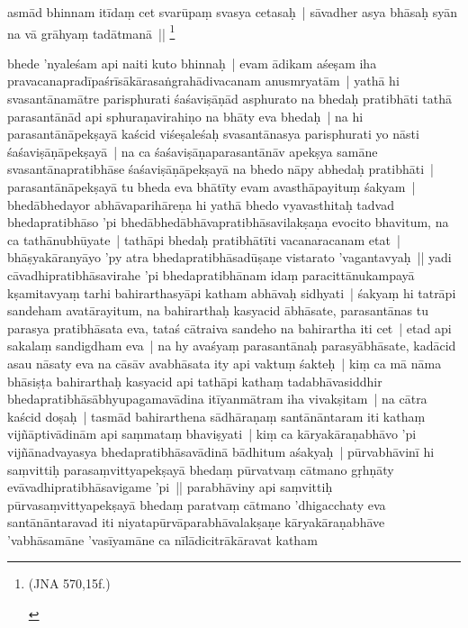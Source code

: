 \documentclass[article,a4paper]{memoir}
\begin{document}
	  \pstart asmā\-d bhinnam itī\-daṃ cet svarū\-paṃ svasya cetasaḥ | sā\-vadher asya bhā\-saḥ syā\-n na vā\- grā\-hyaṃ tadā\-tmanā\- || \footnote{\begin{english}(JNA 570,15f.)\end{english}}
	\pend
      

	  \pstart bhede 'nyaleśam api naiti kuto bhinnaḥ | evam ā\-dikam aśeṣam iha pravacanapradī\-paśrī\-sā\-kā\-rasaṅgrahā\-divacanam anusmryatā\-m | \label{thakur75-147.21} yathā\- hi svasantā\-namā\-tre parisphurati śaśaviṣā\-ṇā\-d asphurato na bhedaḥ pratibhā\-ti tathā\- parasantā\-nā\-d api sphuraṇavirahiṇo na bhā\-ty eva bhedaḥ | na hi parasantā\-nā\-pekṣayā\- kaścid viśeṣaleśaḥ svasantā\-nasya parisphurati yo nā\-sti śaśaviṣā\-ṇā\-pekṣayā\- | na ca śaśaviṣā\-ṇaparasantā\-nā\-v apekṣya samā\-ne svasantā\-napratibhā\-se śaśaviṣā\-ṇā\-pekṣayā\- na bhedo nā\-py abhedaḥ pratibhā\-ti | parasantā\-nā\-pekṣayā\- tu bheda eva bhā\-tī\-ty evam avasthā\-payituṃ śakyam | \label{thakur75-147.27} bhedā\-bhedayor abhā\-vaparihā\-reṇa hi yathā\- bhedo vyavasthitaḥ tadvad bhedapratibhā\-so 'pi bhedā\-bhedā\-bhā\-vapratibhā\-savilakṣaṇa evocito bhavitum, na ca tathā\-nubhū\-yate | tathā\-pi bhedaḥ pratibhā\-tī\-ti vacanaracanam etat | bhā\-ṣyakā\-ranyā\-yo 'py atra bhedapratibhā\-sadū\-ṣaṇe vistarato 'vagantavyaḥ || \label{thakur75-148.1} yadi cā\-vadhipratibhā\-savirahe 'pi bhedapratibhā\-nam idaṃ paracittā\-nukampayā\- kṣamitavyaṃ tarhi bahirarthasyā\-pi katham abhā\-vaḥ sidhyati | śakyaṃ hi tatrā\-pi sandeham avatā\-rayitum, na bahirarthaḥ kasyacid ā\-bhā\-sate, parasantā\-nas tu parasya pratibhā\-sata eva, tataś cā\-traiva sandeho na bahirartha iti cet | etad api sakalaṃ sandigdham eva | na hy avaśyaṃ parasantā\-naḥ parasyā\-bhā\-sate, kadā\-cid asau nā\-saty eva na cā\-sā\-v avabhā\-sata ity api vaktuṃ śakteḥ | \label{thakur75-148.7} kiṃ ca mā\- nā\-ma bhā\-siṣṭa bahirarthaḥ kasyacid api tathā\-pi kathaṃ tadabhā\-vasiddhir bhedapratibhā\-sā\-bhyupagamavā\-dina itī\-yanmā\-tram iha vivakṣitam | na cā\-tra kaścid doṣaḥ | tasmā\-d bahirarthena sā\-dhā\-raṇaṃ santā\-nā\-ntaram iti kathaṃ vijñā\-ptivā\-dinā\-m api saṃmataṃ bhaviṣyati | kiṃ ca kā\-ryakā\-raṇabhā\-vo 'pi vijñā\-nadvayasya bhedapratibhā\-savā\-dinā\- bā\-dhitum aśakyaḥ | pū\-rvabhā\-vinī\- hi saṃvittiḥ parasaṃvittyapekṣayā\- bhedaṃ pū\-rvatvaṃ cā\-tmano gṛhṇā\-ty evā\-vadhipratibhā\-savigame 'pi || \label{thakur75-148.13} parabhā\-viny api saṃvittiḥ pū\-rvasaṃvittyapekṣayā\- bhedaṃ paratvaṃ cā\-tmano 'dhigacchaty eva santā\-nā\-ntaravad iti niyatapū\-rvā\-parabhā\-valakṣaṇe kā\-ryakā\-raṇabhā\-ve 'vabhā\-samā\-ne 'vasī\-yamā\-ne ca nī\-lā\-dicitrā\-kā\-ravat katham
	\pend
      
\end{document}
